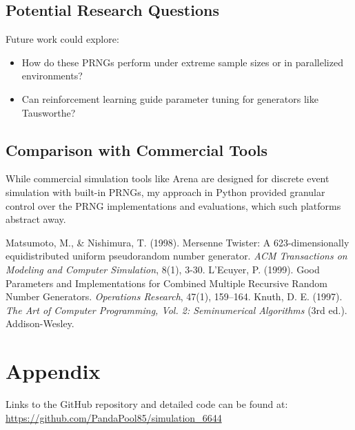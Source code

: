 \documentclass[twocolumn,12pt]{article}
\begin{document}
\subsection{Potential Research Questions}
Future work could explore:
\begin{itemize}
    \item How do these PRNGs perform under extreme sample sizes or in parallelized environments?
    \item Can reinforcement learning guide parameter tuning for generators like Tausworthe?
\end{itemize}

\subsection{Comparison with Commercial Tools}
While commercial simulation tools like Arena are designed for discrete event simulation with built-in PRNGs, my approach in Python provided granular control over the PRNG implementations and evaluations, which such platforms abstract away.

\begin{thebibliography}{9}
 Matsumoto, M., \& Nishimura, T. (1998). Mersenne Twister: A 623-dimensionally equidistributed uniform pseudorandom number generator. \textit{ACM Transactions on Modeling and Computer Simulation}, 8(1), 3-30.
 L’Ecuyer, P. (1999). Good Parameters and Implementations for Combined Multiple Recursive Random Number Generators. \textit{Operations Research}, 47(1), 159–164.
 Knuth, D. E. (1997). \textit{The Art of Computer Programming, Vol. 2: Seminumerical Algorithms} (3rd ed.). Addison-Wesley.
\end{thebibliography}

\section{Appendix}
Links to the GitHub repository and detailed code can be found at: \url{https://github.com/PandaPool85/simulation_6644}
\end{document}
